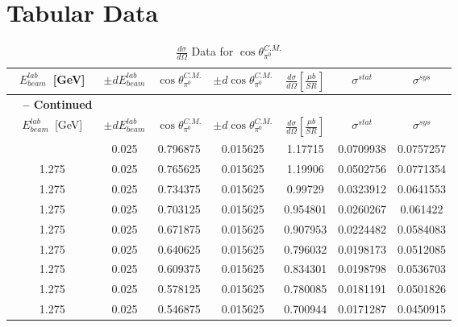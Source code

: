 \chapter{\label{sec:app.tab}Tabular Data}
\setlength\LTleft{-30pt}            %
\setlength\LTright{-30pt}  
\footnotesize
\begin{flushleft}
\begin{longtable}{ccccccc}
\caption[$\frac{d\sigma}{d\Omega} \frac{\mu b}{SR}$ Data for $\cos\theta^{C.M.}_{\pi^{0}}$]{$\frac{d\sigma}{d\Omega}$ Data for $\cos\theta^{C.M.}_{\pi^{0}}$ } \\
%
$E_{beam}^{lab}$~[GeV] & $\pm dE_{beam}^{lab}$ & $\cos\theta^{C.M.}_{\pi^{0}}$  & $\pm d\cos\theta^{C.M.}_{\pi^{0}}$ & $\frac{d\sigma}{d\Omega} \left[\frac{\mu b}{SR}\right]$ & $\sigma^{stat}$ & $\sigma^{sys}$ \\
\hline
\endfirsthead
{{\bfseries \tablename\ \thetable{} -- Continued }}\\
$E_{beam}^{lab}$~[GeV] & $\pm dE_{beam}^{lab}$ & $\cos\theta^{C.M.}_{\pi^{0}}$  & $\pm d\cos\theta^{C.M.}_{\pi^{0}}$ & $\frac{d\sigma}{d\Omega} \left[\frac{\mu b}{SR}\right]$ & $\sigma^{stat}$ & $\sigma^{sys}$ \\
\hline
\endhead
\hline
\endfoot
\hline
\endlastfoot
\hline
1.275 & 0.025 & 0.796875 & 0.015625 & 1.17715 & 0.0709938 & 0.0757257  \\ 
1.275 & 0.025 & 0.765625 & 0.015625 & 1.19906 & 0.0502756 & 0.0771354  \\ 
1.275 & 0.025 & 0.734375 & 0.015625 & 0.99729 & 0.0323912 & 0.0641553  \\ 
1.275 & 0.025 & 0.703125 & 0.015625 & 0.954801 & 0.0260267 & 0.061422  \\ 
1.275 & 0.025 & 0.671875 & 0.015625 & 0.907953 & 0.0224482 & 0.0584083  \\ 
1.275 & 0.025 & 0.640625 & 0.015625 & 0.796032 & 0.0198173 & 0.0512085  \\ 
1.275 & 0.025 & 0.609375 & 0.015625 & 0.834301 & 0.0198798 & 0.0536703  \\ 
1.275 & 0.025 & 0.578125 & 0.015625 & 0.780085 & 0.0181191 & 0.0501826  \\ 
1.275 & 0.025 & 0.546875 & 0.015625 & 0.700944 & 0.0171287 & 0.0450915  \\ 

\end{longtable}
\end{flushleft}
